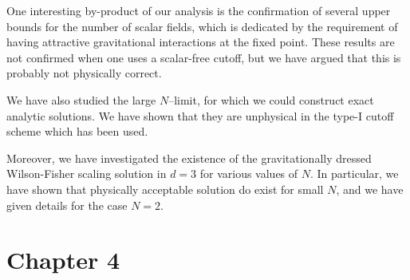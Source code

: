 \documentclass[11pt]{book}
\numberwithin{equation}{chapter}
\begin{document}
One interesting by-product of our analysis is the confirmation
of several upper bounds for the number of scalar fields,
which is dedicated by the requirement of having attractive
gravitational interactions at the fixed point.
These results are not confirmed when one uses a scalar-free cutoff,
but we have argued that this is probably not physically correct.

We have also studied the large $N$--limit, for which we could
construct exact analytic solutions.
We have shown that they are unphysical in the type-I cutoff scheme
which has been used.

Moreover, we have investigated the existence of the gravitationally
dressed Wilson-Fisher scaling solution in $d=3$ for various values of $N$.
In particular, we have shown that physically acceptable solution do exist
for small $N$, and we have given details for the case $N=2$.



\section*{Chapter 4}
\end{document}

